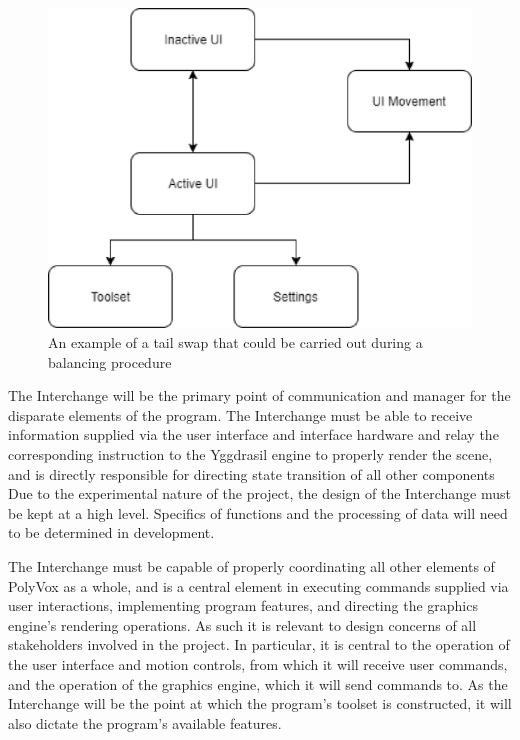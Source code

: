 \documentclass[onecolumn, draftclsnofoot,10pt, compsoc]{IEEEtran}
\newcounter{threesection}[subsubsection]
\begin{document}
\begin{figure}[H]
\begin{center}
\includegraphics[width=\textwidth]{UIDiagram.eps}
\caption{An example of a tail swap that could be carried out during a balancing procedure}
\end{center}
\end{figure}

The Interchange will be the primary point of communication and manager for the disparate elements of the program.
The Interchange must be able to receive information supplied via the user interface and interface hardware and relay the corresponding instruction to the Yggdrasil engine to properly render the scene, and is directly responsible for directing state transition of all other components
 Due to the experimental nature of the project, the design of the Interchange must be kept at a high level. Specifics of functions and the processing of data will need to be determined in development. 

The Interchange must be capable of properly coordinating all other elements of PolyVox as a whole, and is a central element  in executing commands supplied via user interactions, implementing program features, and directing the graphics engine’s rendering operations. As such it is relevant to design concerns of all stakeholders involved in the project. In particular, it is central to the operation of the user interface and motion controls, from which it will receive user commands, and the operation of the graphics engine, which it will send commands to. As the Interchange will be the point at which the program’s toolset is constructed, it will also dictate the program’s available features.
\end{document}
